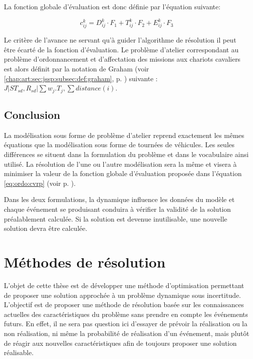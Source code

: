  La fonction globale d'évaluation est donc définie par l'équation suivante: 
 
 \begin{equation}
  \label{eq:costJSSP}
  c^k_{ij} = D^k_{ij} \cdot F_1 + T^k_{ij} \cdot F_2 + E^k_{ij} \cdot F_3
 \end{equation}

 Le critère de l'avance ne servant qu'à guider l'algorithme de résolution il peut être écarté de la fonction d'évaluation. Le problème d'atelier correspondant au problème d'ordonnancement et d'affectation des missions aux chariots cavaliers est alors définit par la notation de Graham (voir \ref{chap:art:sec:jssp:subsec:def:graham}, p. \pageref{chap:art:sec:jssp:subsec:def:graham}) suivante : ${ J|ST_{sd}, R_{sd}|\sum w_j.T_{j} , \sum distance(i)}$.
 
 \subsection{Conclusion}
 
 La modélisation sous forme de problème d'atelier reprend exactement les mêmes équations que la modélisation sous forme de tournées de véhicules. Les seules différences se situent dans la formulation du problème et dans le vocabulaire ainsi utilisé. La résolution de l'une ou l'autre modélisation sera la même et visera à minimiser la valeur de la fonction globale d'évaluation proposée dans l'équation \ref{eq:ordo:cvrp} (voir p. \pageref{eq:ordo:cvrp}).
 
 Dans les deux formulations, la dynamique influence les données du modèle et chaque événement se produisant conduira à vérifier la validité de la solution préalablement calculée. Si la solution est devenue inutilisable, une nouvelle solution devra être calculée.
 
\section{Méthodes de résolution}

L'objet de cette thèse est de développer une méthode d'optimisation permettant de proposer une solution approchée à un problème dynamique sous incertitude. L'objectif est de proposer une méthode de résolution basée sur les connaissances actuelles des caractéristiques du problème sans prendre en compte les événements futurs. En effet, il ne sera pas question ici d'essayer de prévoir la réalisation ou la non réalisation, ni même la probabilité de réalisation d'un événement, mais plutôt de réagir aux nouvelles caractéristiques afin de toujours proposer une solution réalisable.

